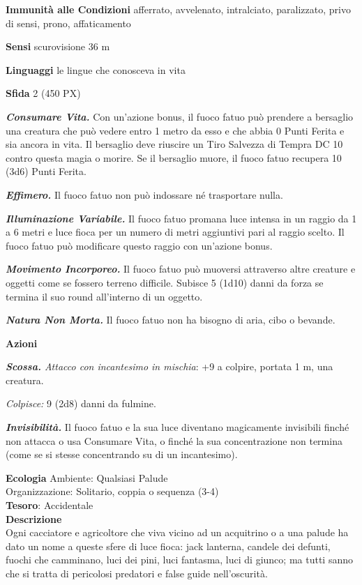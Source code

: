 \begin{multicols}{2}
\textbf{Immunità alle Condizioni} afferrato, avvelenato, intralciato, paralizzato, privo di sensi, prono, affaticamento

\textbf{Sensi} scurovisione 36 m

\textbf{Linguaggi} le lingue che conosceva in vita

\textbf{Sfida} 2 (450 PX)

\textit{\textbf{Consumare Vita.}} Con un'azione bonus, il fuoco fatuo può prendere a bersaglio una creatura che può vedere entro 1 metro da esso e che abbia 0 Punti Ferita e sia ancora in vita. Il bersaglio deve riuscire un Tiro Salvezza di Tempra DC 10 contro questa magia o morire. Se il bersaglio muore, il fuoco fatuo recupera 10 (3d6) Punti Ferita.

\textit{\textbf{Effimero.}} Il fuoco fatuo non può indossare né trasportare nulla.

\textit{\textbf{Illuminazione Variabile.}} Il fuoco fatuo promana luce intensa in un raggio da 1 a 6 metri e luce fioca per un numero di metri aggiuntivi pari al raggio scelto. Il fuoco fatuo può modificare questo raggio con un'azione bonus.

\textit{\textbf{Movimento Incorporeo.}} Il fuoco fatuo può muoversi attraverso altre creature e oggetti come se fossero terreno difficile. Subisce 5 (1d10) danni da forza se termina il suo round all'interno di un oggetto.

\textit{\textbf{Natura Non Morta.}} Il fuoco fatuo non ha bisogno di aria, cibo o bevande.

\textbf{Azioni}

\textit{\textbf{Scossa.} Attacco con incantesimo in mischia}: +9 a colpire, portata 1 m, una creatura.

\textit{Colpisce:} 9 (2d8) danni da fulmine.

\textit{\textbf{Invisibilità.}} Il fuoco fatuo e la sua luce diventano magicamente invisibili finché non attacca o usa Consumare Vita, o finché la sua concentrazione non termina (come se si stesse concentrando su di un incantesimo).

\textbf{Ecologia}
Ambiente: Qualsiasi Palude\\
Organizzazione: Solitario, coppia o sequenza (3-4)\\
\textbf{Tesoro}: Accidentale\\
\textbf{Descrizione}\\
Ogni cacciatore e agricoltore che viva vicino ad un acquitrino o a una palude ha dato un nome a queste sfere di luce fioca: jack lanterna, candele dei defunti, fuochi che camminano, luci dei pini, luci fantasma, luci di giunco; ma tutti sanno che si tratta di pericolosi predatori e false guide nell'oscurità.


\end{multicols}

